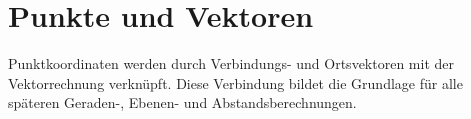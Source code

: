 \section{Punkte und Vektoren}
\label{sec:analytic_geometry_points_and_vectors}

Punktkoordinaten werden durch Verbindungs- und Ortsvektoren mit der
Vektorrechnung verknüpft. Diese Verbindung bildet die Grundlage für alle
späteren Geraden-, Ebenen- und Abstandsberechnungen.


